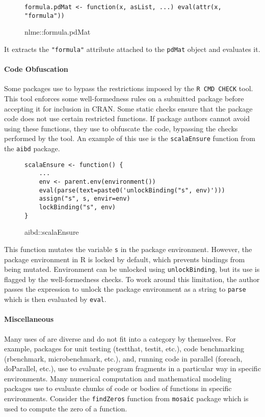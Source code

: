 \documentclass[screen,acmsmall]{acmart}%
\newcommand{\code}[1]{\lstinline |#1|\xspace}
\begin{document}
\begin{figure}[h]
\begin{lstlisting}
formula.pdMat <- function(x, asList, ...) eval(attr(x, "formula"))
\end{lstlisting}
  \caption{nlme::formula.pdMat}
\end{figure}

It extracts the \code{"formula"} attribute attached to the \code{pdMat} object
and evaluates it.


\paragraph{Code Obfuscation} Some packages use \eval to bypass the restrictions
imposed by the \code{R CMD CHECK} tool. This tool enforces some well-formedness
rules on a submitted package before accepting it for inclusion in CRAN. Some
static checks ensure that the package code does not use certain restricted
functions. If package authors cannot avoid using these functions, they use \eval
to obfuscate the code, bypassing the checks performed by the tool. An example of
this use is the \code{scalaEnsure} function from the \code{aibd} package.
\begin{figure}[h]
\begin{lstlisting}
scalaEnsure <- function() {
    ...
    env <- parent.env(environment())
    eval(parse(text=paste0('unlockBinding("s", env)')))
    assign("s", s, envir=env)
    lockBinding("s", env)
}
\end{lstlisting}
  \caption{aibd::scalaEnsure}
\end{figure}

This function mutates the variable \code{s} in the package environment. However,
the package environment in R is locked by default, which prevents bindings from
being mutated. Environment can be unlocked using \code{unlockBinding}, but its
use is flagged by the well-formedness checks. To work around this limitation,
the author passes the expression to unlock the package environment as a string
to \code{parse} which is then evaluated by \code{eval}.


\paragraph{Miscellaneous} Many uses of \eval are diverse and do not fit into a
category by themselves. For example, packages for unit testing (testthat,
testit, etc.), code benchmarking (rbenchmark, microbenchmark, etc.), and,
running code in parallel (foreach, doParallel, etc.), use \eval to evaluate
program fragments in a particular way in specific environments. Many numerical
computation and mathematical modeling packages use \eval to evaluate chunks of
code or bodies of functions in specific environments. Consider the
\code{findZeros} function from \code{mosaic} package which is used to compute
the zero of a function.
\end{document}
